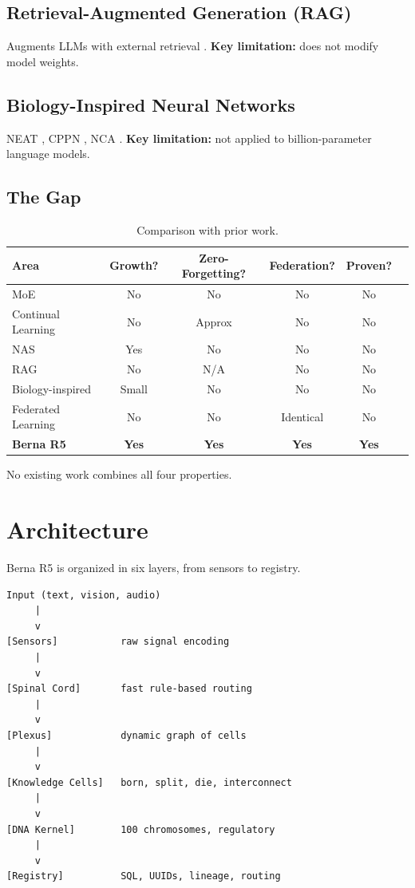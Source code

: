 \documentclass[11pt,a4paper]{article}
\begin{document}
\subsection{Retrieval-Augmented Generation (RAG)}
Augments LLMs with external retrieval \cite{lewis2020,guu2020,borgeaud2022}.
\textbf{Key limitation:} does not modify model weights.

\subsection{Biology-Inspired Neural Networks}
NEAT \cite{stanley2002}, CPPN \cite{stanley2007}, NCA
\cite{mordvintsev2020}. \textbf{Key limitation:} not applied
to billion-parameter language models.

\subsection{The Gap}

\begin{table}[h]
\centering
\caption{Comparison with prior work.}
\label{tab:gap}
\begin{tabular}{lccccc}
\hline
Area & Growth? & Zero-Forgetting? & Federation? & Proven? \\
\hline
MoE & No & No & No & No \\
Continual Learning & No & Approx & No & No \\
NAS & Yes & No & No & No \\
RAG & No & N/A & No & No \\
Biology-inspired & Small & No & No & No \\
Federated Learning & No & No & Identical & No \\
\textbf{Berna R5} & \textbf{Yes} & \textbf{Yes} & \textbf{Yes} & \textbf{Yes} \\
\hline
\end{tabular}
\end{table}

No existing work combines all four properties.

\section{Architecture}
\label{sec:arch}

Berna R5 is organized in six layers, from sensors to registry.

\begin{verbatim}
Input (text, vision, audio)
     |
     v
[Sensors]           raw signal encoding
     |
     v
[Spinal Cord]       fast rule-based routing
     |
     v
[Plexus]            dynamic graph of cells
     |
     v
[Knowledge Cells]   born, split, die, interconnect
     |
     v
[DNA Kernel]        100 chromosomes, regulatory
     |
     v
[Registry]          SQL, UUIDs, lineage, routing
\end{verbatim}
\end{document}
